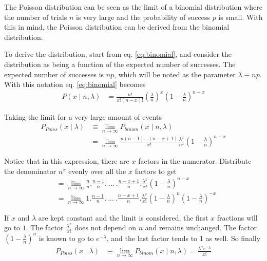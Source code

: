\documentclass[report,12pt]{report}
\begin{document}
The Poisson distribution can be seen as the limit of a binomial distribution where the number of trials $n$ is very large and the probability of success $p$ is small. With this in mind, the Poisson distribution can be derived from the binomial distribution. 

To derive the distribution, start from eq. \ref{eq:binomial}, and consider the distribution as being a function of the expected number of successes. The expected number of successes is $np$, which will be noted as the parameter $\lambda \equiv np$. With this notation eq. \ref{eq:binomial} becomes
\begin{align}
	P(x \mid n,\lambda) 
	&= \frac{n!}{x!(n-x)!} \left(\frac{\lambda}{n}\right)^x 
	\left(1-\frac{\lambda}{n}\right)^{n-x}
\end{align}
	
Taking the limit for a very large amount of events
\begin{align}
	P_{Poiss}(x \mid \lambda) &\equiv \lim_{n \to \infty} P_{binom} (x \mid n,\lambda )
	\nonumber\\
	&= \lim_{n \to \infty} \frac{n(n-1)...(n-x+1)}{x!}\frac{\lambda^x}{n^x}
	\left ( 1-\frac{\lambda}{n}\right)^{n-x}	
\end{align}

Notice that in this expression, there are $x$ factors in the numerator. Distribute the denominator $n^x$ evenly over all the $x$ factors to get
\begin{align}
	&= \lim_{n \to \infty} \frac{n}{n}.\frac{n-1}{n}.\ ...\ .\frac{n-x+1}{n}
	.\frac{\lambda^x}{x!}
	\left ( 1-\frac{\lambda}{n}\right)^{n-x}
	\nonumber\\
	&= \lim_{n \to \infty} 1.\frac{n-1}{n}.\ ...\ .\frac{n-x+1}{n}
	.\frac{\lambda^x}{x!}
	\left ( 1-\frac{\lambda}{n}\right)^{n}
	\left ( 1-\frac{\lambda}{n}\right)^{-x}	
\end{align}

If $x$ and $\lambda$ are kept constant and the limit is considered, the first $x$ fractions will go to $1$. The factor $\frac{\lambda^x}{x!}$ does not depend on $n$ and remains unchanged. The factor $( 1-\frac{\lambda}{n})^{n}$ is known to go to $e^{-\lambda}$, and the last factor tends to 1 as well. So finally
\begin{align}
	P_{Poiss}(x \mid \lambda) &\equiv \lim_{n \to \infty} P_{binom} (x \mid n,\lambda )
	= \frac{\lambda^x e^{-\lambda}}{x!}
\end{align}
\hfill\\
\end{document}

